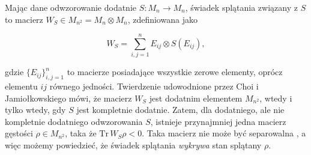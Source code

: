 {\vspace{0.5cm}

Mając dane odwzorowanie dodatnie $S: M_{n} \rightarrow M_{n}$,
świadek splątania związany z $S$ to macierz
$W_{S} \in M_{n^{2}} = M_{n} \! \otimes \! M_{n}$,
zdefiniowana jako
\begin{linenomath*}
 \begin{equation}
\label{def:entanglement-witness}
    W_{S} = \sum \limits_{i,j =1}^{n} E_{ij} \otimes S(E_{ij}),
 \end{equation}
\end{linenomath*}
gdzie $\{ E_{ij}\}_{i,j=1}^{n}$ to macierze posiadające wszystkie
zerowe elementy, oprócz elementu $ij$ równego jedności.
Twierdzenie udowodnione przez Choi i Jamiołkowskiego
\cite{choi1975completely,jamiolkowski1974effective}
mówi, że macierz $W_{S}$ jest dodatnim elementem $M_{n^{2}}$,
wtedy i tylko wtedy, gdy $S$ jest kompletnie dodatnie.
Zatem, dla dodatniego, ale nie kompletnie dodatniego odwzorowania $S$,
istnieje przynajmniej jedna macierz gęstości $\rho \in M_{n^{2}}$,
taka że $\text{Tr}\, W_{S} \rho < 0$.
Taka macierz nie może być separowalna \cite{werner1989quantum},
a więc możemy powiedzieć, że świadek splątania \emph{wykrywa}
stan splątany $\rho$.

}
